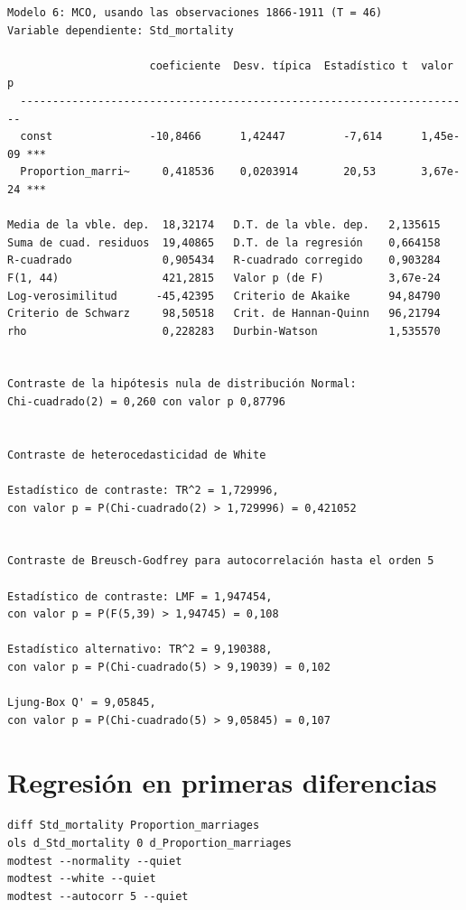 \documentclass[10pt]{article}
\begin{document}
\begin{verbatim}
Modelo 6: MCO, usando las observaciones 1866-1911 (T = 46)
Variable dependiente: Std_mortality

                      coeficiente  Desv. típica  Estadístico t  valor p 
  ----------------------------------------------------------------------
  const               -10,8466      1,42447         -7,614      1,45e-09 ***
  Proportion_marri~     0,418536    0,0203914       20,53       3,67e-24 ***

Media de la vble. dep.  18,32174   D.T. de la vble. dep.   2,135615
Suma de cuad. residuos  19,40865   D.T. de la regresión    0,664158
R-cuadrado              0,905434   R-cuadrado corregido    0,903284
F(1, 44)                421,2815   Valor p (de F)          3,67e-24
Log-verosimilitud      -45,42395   Criterio de Akaike      94,84790
Criterio de Schwarz     98,50518   Crit. de Hannan-Quinn   96,21794
rho                     0,228283   Durbin-Watson           1,535570


Contraste de la hipótesis nula de distribución Normal:
Chi-cuadrado(2) = 0,260 con valor p 0,87796


Contraste de heterocedasticidad de White

Estadístico de contraste: TR^2 = 1,729996,
con valor p = P(Chi-cuadrado(2) > 1,729996) = 0,421052


Contraste de Breusch-Godfrey para autocorrelación hasta el orden 5

Estadístico de contraste: LMF = 1,947454,
con valor p = P(F(5,39) > 1,94745) = 0,108

Estadístico alternativo: TR^2 = 9,190388,
con valor p = P(Chi-cuadrado(5) > 9,19039) = 0,102

Ljung-Box Q' = 9,05845,
con valor p = P(Chi-cuadrado(5) > 9,05845) = 0,107
\end{verbatim}
\section*{Regresión en primeras diferencias}
\label{sec:orgcd199e9}

\begin{verbatim}
diff Std_mortality Proportion_marriages
ols d_Std_mortality 0 d_Proportion_marriages
modtest --normality --quiet
modtest --white --quiet
modtest --autocorr 5 --quiet
\end{verbatim}
\end{document}
